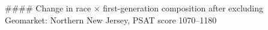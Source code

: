 #### Change in race × first-generation composition after excluding Geomarket: Northern New Jersey, PSAT score 1070–1180
